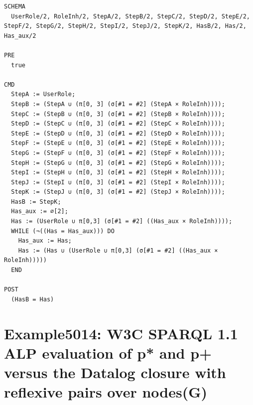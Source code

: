 \documentclass[10pt]{article}
\begin{document}
\begin{Verbatim}[fontsize=\scriptsize,breaklines=true,breakanywhere=true,frame=single,framesep=1.5mm]
SCHEMA
  UserRole/2, RoleInh/2, StepA/2, StepB/2, StepC/2, StepD/2, StepE/2, StepF/2, StepG/2, StepH/2, StepI/2, StepJ/2, StepK/2, HasB/2, Has/2, Has_aux/2

PRE
  true 

CMD
  StepA := UserRole;
  StepB := (StepA ∪ (π[0, 3] (σ[#1 = #2] (StepA × RoleInh))));
  StepC := (StepB ∪ (π[0, 3] (σ[#1 = #2] (StepB × RoleInh))));
  StepD := (StepC ∪ (π[0, 3] (σ[#1 = #2] (StepC × RoleInh))));
  StepE := (StepD ∪ (π[0, 3] (σ[#1 = #2] (StepD × RoleInh))));
  StepF := (StepE ∪ (π[0, 3] (σ[#1 = #2] (StepE × RoleInh))));
  StepG := (StepF ∪ (π[0, 3] (σ[#1 = #2] (StepF × RoleInh))));
  StepH := (StepG ∪ (π[0, 3] (σ[#1 = #2] (StepG × RoleInh))));
  StepI := (StepH ∪ (π[0, 3] (σ[#1 = #2] (StepH × RoleInh))));
  StepJ := (StepI ∪ (π[0, 3] (σ[#1 = #2] (StepI × RoleInh))));
  StepK := (StepJ ∪ (π[0, 3] (σ[#1 = #2] (StepJ × RoleInh))));
  HasB := StepK;
  Has_aux := ∅[2];
  Has := (UserRole ∪ π[0,3] (σ[#1 = #2] ((Has_aux × RoleInh))));
  WHILE (¬((Has = Has_aux))) DO
    Has_aux := Has;
    Has := (Has ∪ (UserRole ∪ π[0,3] (σ[#1 = #2] ((Has_aux × RoleInh)))))
  END

POST
  (HasB = Has)
\end{Verbatim}

\Needspace{0.45\textheight}

\section{Example5014: W3C SPARQL 1.1 ALP evaluation of p* and p+ versus the Datalog closure with reflexive pairs over nodes(G)}\label{case:Example5014}
\end{document}
